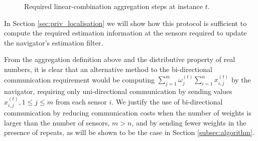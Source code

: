 \documentclass[twocolumn]{autart}
\begin{document}
\begin{figure}[htbp]
\vspace{\baselineskip}
\caption{Required linear-combination aggregation steps at instance $t$.}
\label{fig:agg_steps}
\end{figure}

In Section \ref{sec:priv_localisation} we will show how this protocol is sufficient to compute the required estimation information at the sensors required to update the navigator's estimation filter.

\begin{rem}
    From the aggregation definition above and the distributive property of real numbers, it is clear that an alternative method to the bi-directional communication requirement would be computing $\sum^{m}_{j=1}\omega_j^{(t)}\sum^{n}_{i=1} x_{i,j}^{(t)}$ by the navigator, requiring only uni-directional communication by sending values $x_{i,j}^{(t)}, 1 \leq j \leq m$ from each sensor $i$. We justify the use of bi-directional communication by reducing communication costs when the number of weights is larger than the number of sensors, $m>n$, and by sending fewer weights in the presence of repeats, as will be shown to be the case in Section \ref{subsec:algorithm}.
\end{rem}

% 
% 
\end{document}
